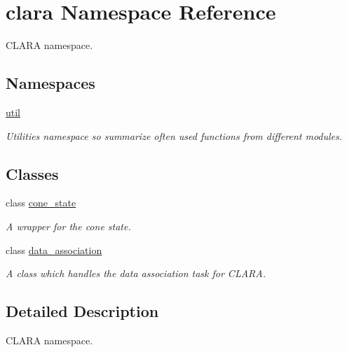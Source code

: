 \hypertarget{namespaceclara}{}\section{clara Namespace Reference}
\label{namespaceclara}


C\+L\+A\+RA namespace.  


\subsection*{Namespaces}
\begin{DoxyCompactItemize}
\item 
 \hyperlink{namespaceclara_1_1util}{util}
\begin{DoxyCompactList}\small\item\em Utilities namespace so summarize often used functions from different modules. \end{DoxyCompactList}\end{DoxyCompactItemize}
\subsection*{Classes}
\begin{DoxyCompactItemize}
\item 
class \hyperlink{classclara_1_1cone__state}{cone\+\_\+state}
\begin{DoxyCompactList}\small\item\em A wrapper for the cone state. \end{DoxyCompactList}\item 
class \hyperlink{classclara_1_1data__association}{data\+\_\+association}
\begin{DoxyCompactList}\small\item\em A class which handles the data association task for C\+L\+A\+RA. \end{DoxyCompactList}\end{DoxyCompactItemize}


\subsection{Detailed Description}
C\+L\+A\+RA namespace. 

